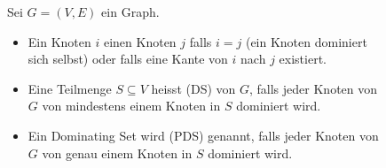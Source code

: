 \begin{frame}[label=repetition]
	\begin{figure}[fragile]
		\begin{mydefinition}\label{mydefinition:DominatingSet}
		Sei $G = (V, E)$ ein Graph.
		\begin{itemize}
			\item Ein Knoten $i$  einen Knoten $j$ falls $i = j$ (ein Knoten dominiert sich selbst) oder falls eine Kante von $i$ nach $j$ existiert.
			\item Eine Teilmenge $S\subseteq V$ heisst  (DS) von $G$, falls jeder Knoten von $G$ von mindestens einem Knoten in $S$ dominiert wird.
			\item Ein Dominating Set wird  (PDS) genannt, falls jeder Knoten von $G$ von genau einem Knoten in $S$ dominiert wird.
		\end{itemize}
		\end{mydefinition}
	\end{figure}
\end{frame}

